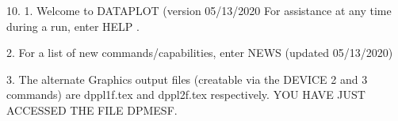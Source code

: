 10.
1. Welcome to DATAPLOT (version 05/13/2020  For assistance at
   any time during a run, enter HELP   .

2. For a list of new commands/capabilities,
   enter NEWS  (updated 05/13/2020)

3. The alternate Graphics output files (creatable
   via the DEVICE 2 and 3 commands) are
   dppl1f.tex and dppl2f.tex respectively.
YOU HAVE JUST ACCESSED THE FILE DPMESF.
